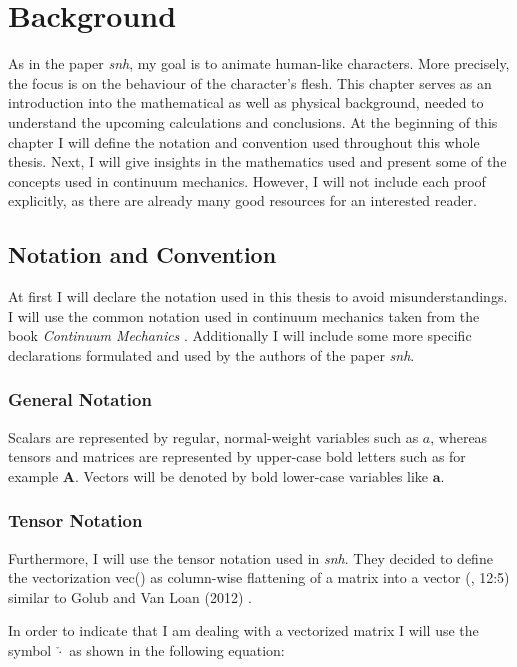 \chapter{Background} \label{c:Background}
As in the paper \textit{\acrshort{snh}}, my goal is to animate human-like characters. More precisely, the focus is on the behaviour of the character's flesh. This chapter serves as an introduction into the mathematical as well as physical background, needed to understand the upcoming calculations and conclusions. At the beginning of this chapter I will define the notation and convention used throughout this whole thesis. Next, I will give insights in the mathematics used and present some of the concepts used in continuum mechanics. However, I will not include each proof explicitly, as there are already many good resources for an interested reader.

\section{Notation and Convention}
At first I will declare the notation used in this thesis to avoid misunderstandings. I will use the common notation used in continuum mechanics taken from the book \textit{Continuum Mechanics} \cite{Spencer1980}. Additionally I will include some more specific declarations formulated and used by the authors of the paper \textit{\acrshort{snh}}.


\subsection{General Notation}
Scalars are represented by regular, normal-weight variables such as $a$, whereas 
tensors and matrices are represented by upper-case bold letters such as for example $\textbf{A}$. Vectors will be denoted by bold lower-case variables like $\textbf{a}$. 


\subsection{Tensor Notation}
Furthermore, I will use the tensor notation used in \textit{\acrshort{snh}}. They decided to define the vectorization vec(\cdot) as column-wise flattening of a matrix into a vector (\cite{Smith:2018:SNF:3191713.3180491}, 12:5) similar to Golub and Van Loan (2012) \cite{golub2012matrix}.

In order to indicate that I am dealing with a vectorized matrix I will use the symbol $\check{\cdot}$ as shown in the following equation:

